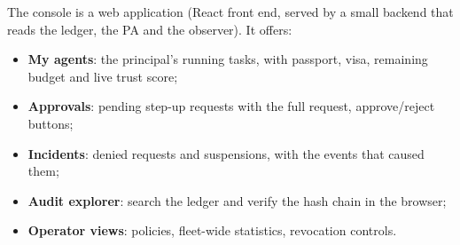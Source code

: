 The console is a web application (React front end, served by a small backend that reads the ledger, the PA and the observer). It offers:
\begin{itemize}
  \item \textbf{My agents}: the principal's running tasks, with passport, visa, remaining budget and live trust score;
  \item \textbf{Approvals}: pending step-up requests with the full request, approve/reject buttons;
  \item \textbf{Incidents}: denied requests and suspensions, with the events that caused them;
  \item \textbf{Audit explorer}: search the ledger and verify the hash chain in the browser;
  \item \textbf{Operator views}: policies, fleet-wide statistics, revocation controls.
\end{itemize}

